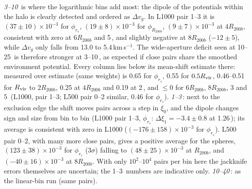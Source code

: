 \emph{3--10\,\Mpch} is where the logarithmic bins add most: the dipole of the potentials within the halo is clearly
detected and ordered as $\Delta v_g$. In L1000 pair 1--3 it is $(37\pm10)\times10^{-3}$ for $\phi_{r_s}$,
$(19\pm8)\times10^{-3}$ for $\phi_{R_{200b}}$, $(9\pm7)\times10^{-3}$ at $4R_{200b}$, consistent with zero at
$6R_{200b}$ and 5\,\Mpch, and slightly negative at $8R_{200b}$ ($-12\pm5$), while $\Delta v_g$ only falls from 13.0 to
5.4\,km\,s$^{-1}$. The wide-aperture deficit seen at 10--25\,\Mpch{} is therefore stronger at 3--10\,\Mpch, as
expected if close pairs share the smoothed environment potential. Every column lies below its mean-shift estimate
there: measured over estimate (same weights) is 0.65 for $\phi_{r_s}$, 0.55 for $0.5R_{\rm vir}$, 0.46--0.51 for $R_{\rm vir}$ to $2R_{200b}$,
0.25 at $4R_{200b}$ and 0.19 at 2\,\Mpch, and $\le0$ for $6R_{200b}$, $8R_{200b}$, 3 and 5\,\Mpch{} (L1000, pair
1--3; L500 pair 0--2 similar, 0.46 for $\phi_{r_s}$). \emph{1--3\,\Mpch}: next to the exclusion edge the shift moves pairs across a step in $\xi_0$, and the dipole
changes sign and size from bin to bin (L1000 pair 1--3, $\phi_{r_s}$: $\Delta\xi_1=-3.4\pm0.8$ at 1.26\,\Mpch); its
average is consistent with zero in L1000 ($(-176\pm158)\times10^{-3}$ for $\phi_{r_s}$). L500 pair 0--2, with many more close pairs,
gives a positive average for the spheres, $(123\pm38)\times10^{-3}$ for $\phi_{r_s}$ (3$\sigma$) falling to
$(48\pm25)\times10^{-3}$ at $R_{200b}$, and $(-40\pm16)\times10^{-3}$ at $8R_{200b}$. With only
$10^2$--$10^4$ pairs per bin here the jackknife errors themselves are uncertain; the 1--3\,\Mpch{} numbers are
indicative only. \emph{10--40\,\Mpch}: as the linear-bin run (same pairs).

